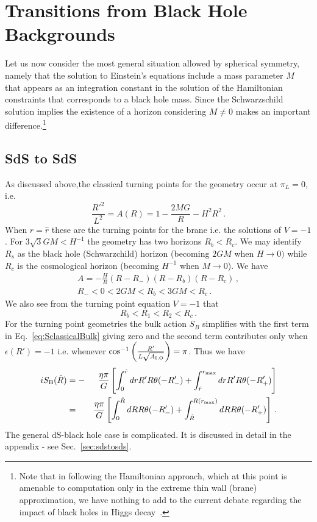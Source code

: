 \documentclass[a4paper,11pt]{article}
\numberwithin{equation}{section}
\numberwithin{equation}{section}
\begin{document}
\section{Transitions from Black Hole Backgrounds}

Let us now consider the most general situation allowed by spherical symmetry, namely that the solution to Einstein's equations include a mass parameter $M$ that appears as an integration constant in the solution of the Hamiltonian constraints that corresponds to a black hole mass. Since the Schwarzschild solution implies the existence of a horizon considering $M\neq 0$ makes an important difference.\footnote{Note that in following the Hamiltonian approach,  which at this point is amenable to computation only in the extreme thin wall (brane) approximation, we have nothing to add to the current debate regarding the impact of black holes in Higgs decay~\cite{Gregory:2013hja,Burda:2015isa, Canko:2017ebb, Strumia:2022jil}.}

 
\subsection{SdS to SdS}


As discussed above,the classical turning points for the geometry occur at $\pi_{L}=0$,
i.e. 
\[
\frac{R'^{2}}{L^{2}}=A(R)=1-\frac{2MG}{R}-H^{2}R^{2} \,.
\]
When $r=\hat{r}$ these are the turning points for the brane i.e.
the solutions of $V=-1$. For $3\sqrt{3}GM<H^{-1}$ the geometry has
two horizons $R_{b}<R_{c}$. We may identify $R_{s}$ as the black hole
(Schwarzchild) horizon (becoming $2GM$ when $H\rightarrow0)$ while
$R_{c}$ is the cosmological horizon (becoming $H^{-1}$ when $M\rightarrow0$).
We have
\begin{align*}
A =-\frac{H}{R}\left(R-R_{-}\right)\left(R-R_{b}\right)\left(R-R_{c}\right) \,,\\
R_{-}<0 <2GM<R_{b}<3GM<R_{c} \,.
\end{align*}
We also see from the turning point equation $V=-1$ that
\[
R_{b}<R_{1}<R_{2}<R_{c} \,.
\]
For the turning point geometries the bulk action $S_{B}$ simplifies
with the first term in Eq.~\eqref{eq:SclassicalBulk} giving zero and the second term
contributes only when $\epsilon(R')=-1$ i.e. whenever $\cos^{-1}\left(\frac{R'}{L\sqrt{A_{{\rm I,{\rm O}}}}}\right)=\pi$.
Thus we have
\begin{eqnarray}
iS_{{\rm B}}(\hat{R}) & =- & \frac{\eta\pi}{G}\left[\int_{0}^{\hat{r}}drR'R\theta(-R_{-}')+\int_{\hat{r}}^{r_{\rm max}}drR'R\theta(-R_{+}')\right]\nonumber \\
 & = & \frac{\eta\pi}{G}\left[\int_{0}^{\hat{R}}dRR\theta(-R_{-}')+\int_{\hat{R}}^{R(r_{\rm max})}dRR\theta(-R_{+}')\right] \,.\label{eq:SBtp}
\end{eqnarray}
The general dS-black hole case is complicated. It is discussed in detail in the appendix - see Sec.~\eqref{sec:sdstosds}.
\end{document}
